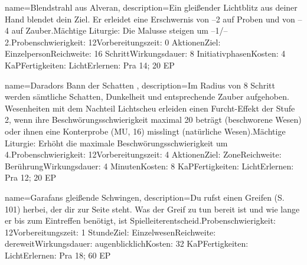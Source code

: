 {
    name={Blendstrahl aus Alveran},
    description={Ein gleißender Lichtblitz aus deiner Hand blendet dein Ziel. Er erleidet eine Erschwernis von –2 auf Proben und von –4 auf Zauber.\newline Mächtige Liturgie: Die Malusse steigen um –1/–2.\newline Probenschwierigkeit: 12\newline Vorbereitungszeit: 0 Aktionen\newline Ziel: Einzelperson\newline Reichweite: 16 Schritt\newline Wirkungsdauer: 8 Initiativphasen\newline Kosten: 4 KaP\newline Fertigkeiten: Licht\newline Erlernen: Pra 14; 20 EP}
}


{
    name={Daradors Bann der Schatten },
    description={Im Radius von 8 Schritt werden sämtliche Schatten, Dunkelheit und entsprechende Zauber aufgehoben. Wesenheiten mit dem Nachteil Lichtscheu erleiden einen Furcht-Effekt der Stufe 2, wenn ihre Beschwörungsschwierigkeit maximal 20 beträgt (beschworene Wesen) oder ihnen eine Konterprobe (MU, 16) misslingt (natürliche Wesen).\newline Mächtige Liturgie: Erhöht die maximale Beschwörungsschwierigkeit um 4.\newline Probenschwierigkeit: 12\newline Vorbereitungszeit: 4 Aktionen\newline Ziel: Zone\newline Reichweite: Berührung\newline Wirkungsdauer: 4 Minuten\newline Kosten: 8 KaP\newline Fertigkeiten: Licht\newline Erlernen: Pra 12; 20 EP}
}


{
    name={Garafans gleißende Schwingen},
    description={Du rufst einen Greifen (S. 101) herbei, der dir zur Seite steht. Was der Greif zu tun bereit ist und wie lange er bis zum Eintreffen benötigt, ist Spielleiterentscheid.\newline Probenschwierigkeit: 12\newline Vorbereitungszeit: 1 Stunde\newline Ziel: Einzelwesen\newline Reichweite: dereweit\newline Wirkungsdauer: augenblicklich\newline Kosten: 32 KaP\newline Fertigkeiten: Licht\newline Erlernen: Pra 18; 60 EP}
}


